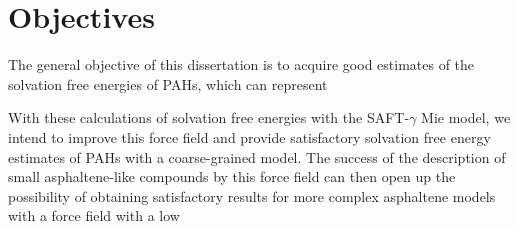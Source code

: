 \chapter{Objectives} %

The general objective of this dissertation is to acquire good estimates of the solvation free energies of PAHs, which can represent 

 With these calculations of solvation free energies with the SAFT-$\gamma$ Mie model, we intend to improve this force field and provide satisfactory solvation free energy estimates of PAHs with a coarse-grained model. The success of the description of small asphaltene-like compounds by this force field can then open up the possibility of obtaining satisfactory results for more complex asphaltene models with a force field with a low


